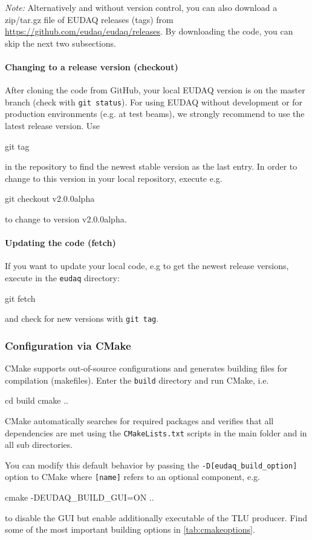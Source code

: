 \textit{Note:} Alternatively and without version control, you can also download a zip/tar.gz file of EUDAQ releases (tags) from \url{https://github.com/eudaq/eudaq/releases}. 
By downloading the code, you can skip the next two subsections. 

\paragraph{Changing to a release version (checkout)}
After cloning the code from GitHub, your local EUDAQ version is on the master branch (check with \texttt{git status}).  
For using EUDAQ without development or for production environments (e.g. at test beams), we strongly recommend to use the latest release version. 
Use 
\begin{listing}[mybash]
git tag 
\end{listing}
in the repository to find the newest stable version as the last entry.
In order to change to this version in your local repository, execute e.g. 
\begin{listing}[mybash]
git checkout v2.0.0alpha
\end{listing}
to change to version v2.0.0alpha.

\paragraph{Updating the code (fetch)}
If you want to update your local code, e.g to get the newest release versions, execute in the \texttt{eudaq} directory: 
\begin{listing}[mybash]
git fetch
\end{listing}
and check for new versions with \texttt{git tag}. 


\subsubsection{Configuration via CMake}
\label{sec:cmake}
CMake supports out-of-source configurations and generates building files for compilation (makefiles). 
Enter the \texttt{build} directory and run CMake, i.e.
\begin{listing}[mybash]
cd build
cmake ..
\end{listing}
CMake automatically searches for required packages and verifies that all dependencies are met using the \texttt{CMakeLists.txt} scripts in the main folder and in all sub directories. 

You can modify this default behavior by passing the \texttt{-D[eudaq\_build\_option]} option to
CMake where \texttt{[name]} refers to an optional component, e.g.
\begin{listing}[mybash]
cmake -DEUDAQ_BUILD_GUI=ON  ..
\end{listing}
to disable the GUI but enable additionally executable of the TLU producer.
Find some of the most important building options in \autoref{tab:cmakeoptions}.

